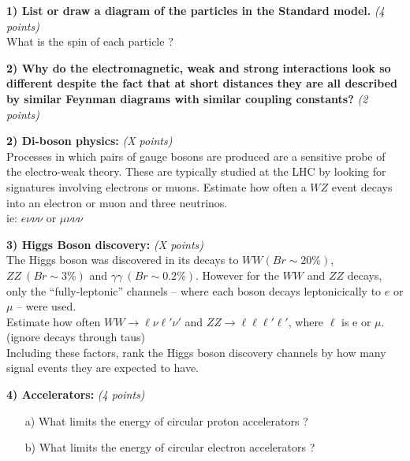 {\large

\textbf{1) List or draw a diagram of the particles in the Standard model. } \hfill \textit{(4 points)}\\
What is the spin of each particle ?

\vspace*{3in}



\textbf{2) Why do the electromagnetic, weak and strong interactions look so different despite the fact that at short distances they are all described by similar Feynman diagrams with similar coupling constants?} \hfill \textit{(2 points)}\\

\vspace{1in}



\textbf{2) Di-boson physics:  } \hfill \textit{(X points)}\\
Processes in which pairs of gauge bosons are produced are a sensitive probe of the electro-weak theory. These are typically studied at the LHC by looking for signatures involving electrons or muons.  
Estimate how often a $WZ$ event decays into an electron or muon and three neutrinos.\\ ie: $e\nu\nu\nu$ or $\mu\nu\nu\nu$




\textbf{3) Higgs Boson discovery: } \hfill \textit{(X points)}\\
The Higgs boson was discovered in its decays to $WW (Br\sim20\%)$, $ZZ\ (Br\sim3\%)$ and $\gamma\gamma\ (Br\sim0.2\%)$.
However for the $WW$ and $ZZ$ decays, only the ``fully-leptonic'' channels -- where each boson decays leptonicically to $e$ or $\mu$ -- were used. \\

Estimate how often $WW \rightarrow \ell\nu\ell'\nu'$ and $ZZ\rightarrow\ell\ell\ell'\ell'$, where $\ell$ is e or $\mu$. (ignore decays through taus)\\

Including these factors, rank the Higgs boson discovery channels by how many signal events they are expected to have.

\vspace*{2in}

\textbf{4) Accelerators: } \hfill \textit{(4 points)}\\
\begin{itemize}
\item[a)]{What limits the energy of circular proton accelerators ?
\vspace*{1.0in}
}
\item[b)]{What limits the energy of circular electron accelerators ?
\vspace*{1.0in}
}
\end{itemize}

}

